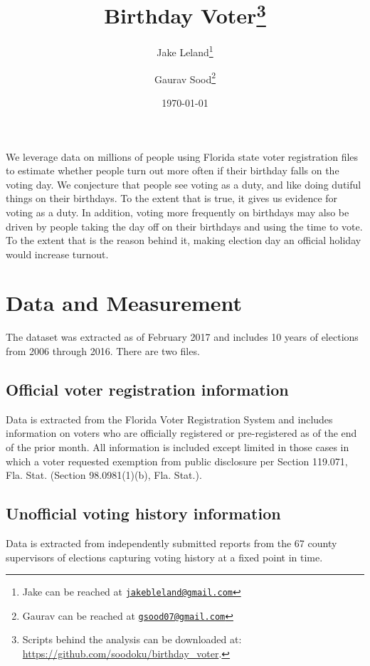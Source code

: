 \documentclass[12pt, letterpaper]{article}
\title{\Large{Birthday Voter}\footnote{Scripts behind the analysis can be downloaded at: \url{https://github.com/soodoku/birthday_voter}.}}
\author{Jake Leland\thanks{Jake can be reached at \href{mailto:jake.leland@utexas.edu}{\footnotesize{\texttt{jakebleland@gmail.com}}}}
\and Gaurav Sood\thanks{Gaurav can be reached at \href{mailto:gsood07@gmail.com}{\footnotesize{\texttt{gsood07@gmail.com}}}}}
\date{\vspace{.5cm}\normalsize{\today}}
\begin{document}
\maketitle

\begin{abstract}

\end{abstract}

\clearpage
\doublespacing
We leverage data on millions of people using Florida state voter registration files to estimate whether people turn out more often if their birthday falls on the voting day. We conjecture that people see voting as a duty, and like doing dutiful things on their birthdays. To the extent that is true, it gives us evidence for voting as a duty. In addition, voting more frequently on birthdays may also be driven by people taking the day off on their birthdays and using the time to vote. To the extent that is the reason behind it, making election day an official holiday would increase turnout.

\section{Data and Measurement}
The dataset was extracted as of February 2017 and includes 10 years of elections from 2006 through 2016. There are two files.

\subsection{Official voter registration information}
Data is extracted from the Florida Voter Registration System and includes information on voters who are officially registered or pre-registered as of the end of the prior month. All information is included except limited in those cases in which a voter requested exemption from public disclosure per Section 119.071, Fla. Stat.  (Section 98.0981(1)(b), Fla. Stat.).

\subsection{Unofficial voting history information}
Data is extracted from independently submitted reports from the 67 county supervisors of elections capturing voting history at a fixed point in time. 
\end{document}

